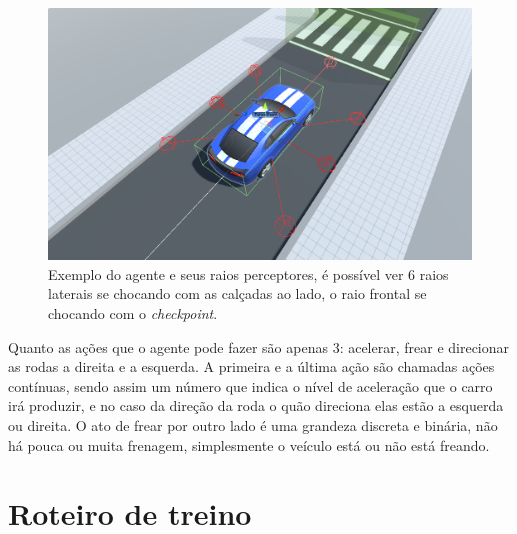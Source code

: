  \begin{figure}[h]
   \centering
   \includegraphics[scale=0.35]{figs/agente-raios-checkpoint.png}
    \caption{Exemplo do agente e seus raios perceptores, é possível ver 6 raios laterais se chocando com as calçadas ao lado, o raio frontal se chocando com o \textit{checkpoint}.}
    \label{fig:casting-rays}
 \end{figure}

 Quanto as ações que o agente pode fazer são apenas 3: acelerar, frear e direcionar as rodas a direita e a esquerda. A primeira e a última ação são chamadas ações contínuas, sendo assim um número que indica o nível de aceleração que o carro irá produzir, e no caso da direção da roda o quão direciona elas estão a esquerda ou direita. O ato de frear por outro lado é uma grandeza discreta e binária, não há pouca ou muita frenagem, simplesmente o veículo está ou não está freando.

 \section{Roteiro de treino}
 